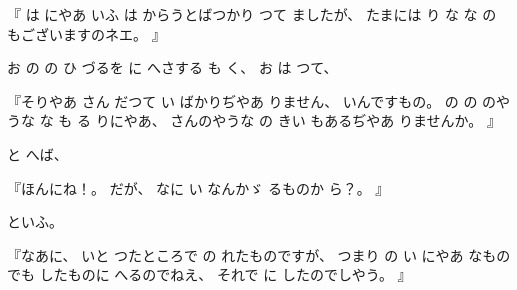 
%
『
は
にやあ
いふ
は
からうとばつかり
つて
ましたが、
%
たまには
り
な
な
の
もございますのネエ。
』

%
お
の
の
ひ
づるを
に
へさする
も
く、
%
お
は
つて、

%
『そりやあ
さん
だつて
い
ばかりぢやあ
りません、
%
いんですもの。
%
の
の
のやうな
な
も
る
りにやあ、
%
さんのやうな
の
きい
もあるぢやあ
りませんか。
』

%
と
へば、

%
『ほんにね！。
%
だが、
%
なに
い
なんかゞ
るものか
ら？。
』

%
といふ。

%
『なあに、
%
いと
つたところで
の
れたものですが、
%
つまり
の
い
にやあ
なものでも
したものに
へるのでねえ、
%
それで
に
したのでしやう。
』

